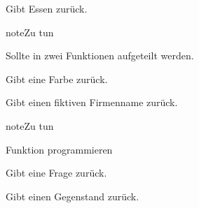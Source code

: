 \documentclass[a4paper,12pt,oneside]{sphinxmanual}
\begin{document}

\begin{fulllineitems}
\label{funktionen:pyzufall.essen}
Gibt Essen zurück.

\begin{notice}{note}{Zu tun}

Sollte in zwei Funktionen aufgeteilt werden.
\end{notice}

\end{fulllineitems}


\begin{fulllineitems}
\label{funktionen:pyzufall.farbe}
Gibt eine Farbe zurück.

\end{fulllineitems}


\begin{fulllineitems}
\label{funktionen:pyzufall.firma}
Gibt einen fiktiven Firmenname zurück.

\begin{notice}{note}{Zu tun}

Funktion programmieren
\end{notice}

\end{fulllineitems}


\begin{fulllineitems}
\label{funktionen:pyzufall.frage}
Gibt eine Frage zurück.

\end{fulllineitems}


\begin{fulllineitems}
\label{funktionen:pyzufall.gegenstand}
Gibt einen Gegenstand zurück.

\end{fulllineitems}

\end{document}
